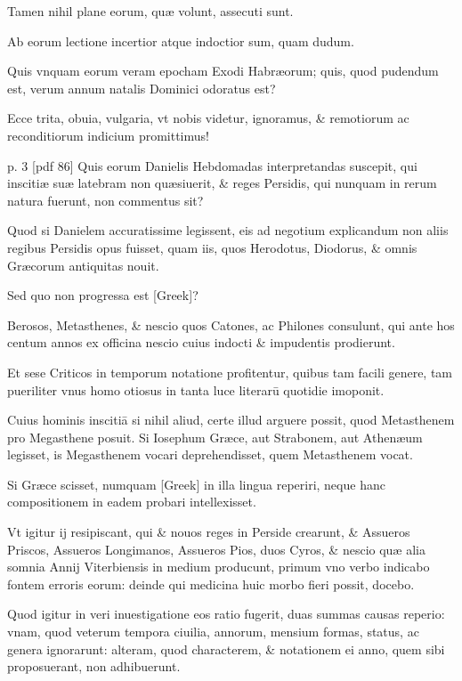\begin{parnumbers}
Tamen nihil plane eorum, quæ volunt,
assecuti sunt.

Ab eorum lectione incertior atque indoctior sum,
quam dudum.

Quis vnquam eorum veram epocham Exodi Habræorum;
quis, quod pudendum est, verum annum natalis Dominici odoratus
est?

Ecce trita, obuia, vulgaria, vt nobis videtur, ignoramus, \& remotiorum
ac reconditiorum indicium promittimus!

\clearpage
p. 3 [pdf 86]
Quis eorum Danielis 
Hebdomadas interpretandas suscepit, qui inscitiæ suæ latebram
non quæsiuerit, \& reges Persidis, qui nunquam in rerum natura fuerunt,
non commentus sit?

Quod si Danielem accuratissime legissent,
eis ad negotium explicandum non aliis regibus Persidis opus fuisset,
quam iis, quos Herodotus, Diodorus, \& omnis Græcorum antiquitas
nouit.

Sed quo non progressa est \textgreek{[Greek]}?

Berosos, Metasthenes, \&
nescio quos Catones, ac Philones consulunt, qui ante hos centum annos
ex officina nescio cuius indocti \& impudentis prodierunt.

Et sese
Criticos in temporum notatione profitentur, quibus tam facili genere,
tam pueriliter vnus homo otiosus in tanta luce literarū quotidie imoponit.

Cuius hominis inscitiā si nihil aliud, certe illud arguere possit, quod
Metasthenem pro Megasthene posuit. Si Iosephum Græce, aut Strabonem,
aut Athenæum legisset, is Megasthenem vocari deprehendisset,
quem Metasthenem vocat.

Si Græce scisset, numquam \textgreek{[Greek]} in illa
lingua reperiri, neque hanc compositionem in eadem probari intellexisset.

Vt igitur ij resipiscant, qui \& nouos reges in Perside crearunt,
\& Assueros Priscos, Assueros Longimanos, Assueros Pios, duos Cyros,
\& nescio quæ alia somnia Annij Viterbiensis in medium producunt,
primum vno verbo indicabo fontem erroris eorum: deinde qui medicina
huic morbo fieri possit, docebo.

Quod igitur in veri inuestigatione
 eos ratio fugerit, duas summas causas reperio: vnam, quod veterum
tempora ciuilia, annorum, mensium formas, status, ac genera ignorarunt:
alteram, quod characterem, \& notationem ei anno, quem sibi
proposuerant, non adhibuerunt.


\end{parnumbers}
